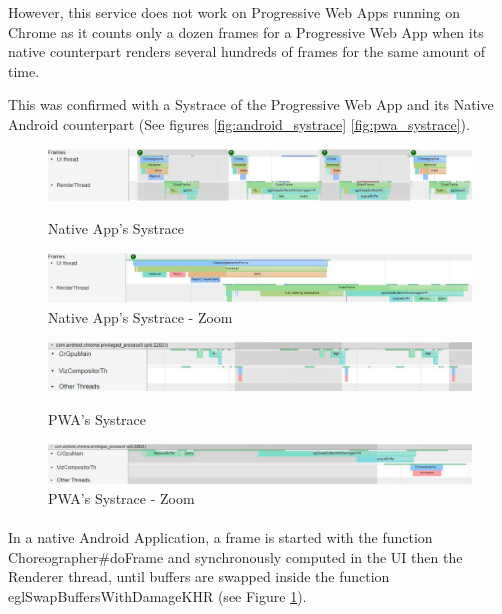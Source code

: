 \documentclass{kththesis}
\begin{document}
    However, this service does not work on Progressive Web Apps running on Chrome as it counts only a dozen frames for a Progressive Web App when its native counterpart renders several hundreds of frames for the same amount of time. 
    
    This was confirmed with a Systrace of the Progressive Web App and its Native Android counterpart (See figures \ref{fig:android_systrace} \ref{fig:pwa_systrace}).
    \begin{figure}[!ht]
        \includegraphics[width=15cm]{kththesis/Figures/android_systrace_frame.jpg}
        \caption{Native App's Systrace}
        \label{fig:android_systrace}
        \includegraphics[width=15cm]{kththesis/Figures/android_systrace_zoom.jpg}
        \caption{Native App's Systrace - Zoom}
        \label{fig:android_systrace_zoom}
    \end{figure}
    
    \begin{figure}[!ht]
        \centering
        \includegraphics[width=15cm]{kththesis/Figures/pwa_systrace.jpg}
        \caption{PWA's Systrace}
        \label{fig:pwa_systrace}
        \includegraphics[width=15cm]{kththesis/Figures/pwa_systrace_zoom.jpg}
        \caption{PWA's Systrace - Zoom}
        \label{fig:pwa_systrace_zoom}
    \end{figure}
    
    \paragraph{}
    In a native Android Application, a frame is started with the function Choreographer\#doFrame and synchronously computed in the UI then the Renderer thread, until buffers are swapped inside the function eglSwapBuffersWithDamageKHR (see Figure \ref{fig:android_systrace_zoom}).
    
\end{document}
